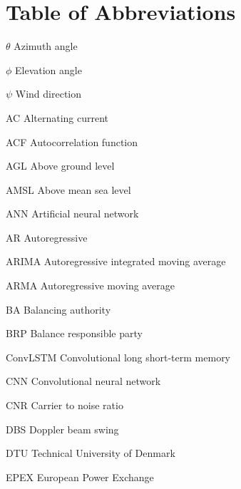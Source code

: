 \chapter{Table of Abbreviations}
\label{sec:abbreviations}


\makeatletter
\newcommand{\tocfill}{\cleaders\hbox{$\m@th \mkern\@dotsep mu . \mkern\@dotsep mu$}\hfill}
\makeatother
\newcommand{\abbrlabel}[1]{\makebox[3cm][l]{\textbf{#1}\ \tocfill}}
\newenvironment{abbreviations}{\begin{list}{}{\renewcommand{\makelabel}{\abbrlabel}%
    \setlength{\labelwidth}{3cm}\setlength{\leftmargin}{\labelwidth+\labelsep}%
        \setlength{\itemsep}{0pt}}}{\end{list}}
\noindent
\bigskip
\begin{abbreviations}
\item[$\theta$] Azimuth angle
\item[$\phi$] Elevation angle
\item[$\psi$] Wind direction

\item[AC] Alternating current
\item[ACF] Autocorrelation function
\item[AGL] Above ground level
\item[AMSL] Above mean sea level
\item[ANN] Artificial neural network
\item[AR] Autoregressive
\item[ARIMA] Autoregressive integrated moving average
\item[ARMA] Autoregressive moving average

\item[BA] Balancing authority
\item[BRP] Balance responsible party

\item[ConvLSTM] Convolutional long short-term memory
\item[CNN] Convolutional neural network
\item[CNR] Carrier to noise ratio

\item[DBS] Doppler beam swing
\item[DTU] Technical University of Denmark

\item[EPEX] European Power Exchange


\end{abbreviations}
